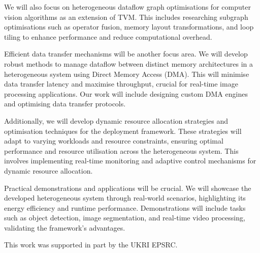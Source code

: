 \documentclass[]{spie}  %
\begin{document}
We will also focus on heterogeneous dataflow graph optimisations for computer vision algorithms as an extension of TVM. This includes researching subgraph optimisations such as operator fusion, memory layout transformations, and loop tiling to enhance performance and reduce computational overhead.

Efficient data transfer mechanisms will be another focus area. We will develop robust methods to manage dataflow between distinct memory architectures in a heterogeneous system using Direct Memory Access (DMA). This will minimise data transfer latency and maximise throughput, crucial for real-time image processing applications. Our work will include designing custom DMA engines and optimising data transfer protocols.

Additionally, we will develop dynamic resource allocation strategies and optimisation techniques for the deployment framework. These strategies will adapt to varying workloads and resource constraints, ensuring optimal performance and resource utilisation across the heterogeneous system. This involves implementing real-time monitoring and adaptive control mechanisms for dynamic resource allocation.

Practical demonstrations and applications will be crucial. We will showcase the developed heterogeneous system through real-world scenarios, highlighting its energy efficiency and runtime performance. Demonstrations will include tasks such as object detection, image segmentation, and real-time video processing, validating the framework's advantages.





\acknowledgments %
 
This work was supported in part by the UKRI EPSRC.

\end{document}
